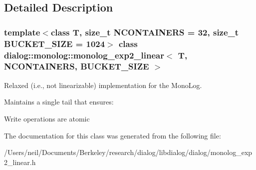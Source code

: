 \subsection{Detailed Description}
\subsubsection*{template$<$class T, size\+\_\+t N\+C\+O\+N\+T\+A\+I\+N\+E\+RS = 32, size\+\_\+t B\+U\+C\+K\+E\+T\+\_\+\+S\+I\+ZE = 1024$>$\newline
class dialog\+::monolog\+::monolog\+\_\+exp2\+\_\+linear$<$ T, N\+C\+O\+N\+T\+A\+I\+N\+E\+R\+S, B\+U\+C\+K\+E\+T\+\_\+\+S\+I\+Z\+E $>$}

Relaxed (i.\+e., not linearizable) implementation for the Mono\+Log.

Maintains a single tail that ensures\+:
\begin{DoxyItemize}
\item Write operations are atomic 
\end{DoxyItemize}

The documentation for this class was generated from the following file\+:\begin{DoxyCompactItemize}
\item 
/\+Users/neil/\+Documents/\+Berkeley/research/dialog/libdialog/dialog/monolog\+\_\+exp2\+\_\+linear.\+h\end{DoxyCompactItemize}
